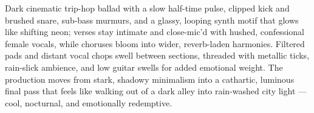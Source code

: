 
\begin{notes}
\end{notes}

\begin{style}
Dark cinematic trip-hop ballad with a slow half-time pulse, clipped kick and brushed snare, sub-bass murmurs, and a glassy, looping synth motif that glows like shifting neon; verses stay intimate and close-mic’d with hushed, confessional female vocals, while choruses bloom into wider, reverb-laden harmonies. %
Filtered pads and distant vocal chops swell between sections, threaded with metallic ticks, rain-slick ambience, and low guitar swells for added emotional weight. %
The production moves from stark, shadowy minimalism into a cathartic, luminous final pass that feels like walking out of a dark alley into rain-washed city light — cool, nocturnal, and emotionally redemptive.
\end{style}

